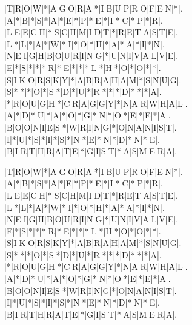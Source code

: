 \documentclass{article}
\begin{document}
\begin{figure}[htb!]
	\begin{Puzzle}{21}{13}
		|T|R|O|W|*|A|G|O|R|A|*|I|B|U|P|R|O|F|E|N|*|.
		|A|*|B|*|S|*|A|*|E|*|P|*|E|*|I|*|C|*|P|*|R|.
		|L|E|E|C|H|*|S|C|H|M|I|D|T|*|R|E|T|A|S|T|E|.
		|L|*|L|*|A|*|W|*|I|*|O|*|H|*|A|*|A|*|I|*|N|.
		|N|E|I|G|H|B|O|U|R|I|N|G|*|U|N|I|V|A|L|V|E|.
		|E|*|S|*|*|*|R|*|E|*|*|*|L|*|H|*|O|*|O|*|*|.
		|S|I|K|O|R|S|K|Y|*|A|B|R|A|H|A|M|*|S|N|U|G|.
		|S|*|*|*|O|*|S|*|D|*|U|*|R|*|*|*|D|*|*|*|A|.
		|*|R|O|U|G|H|*|C|R|A|G|G|Y|*|N|A|R|W|H|A|L|.
		|A|*|D|*|U|*|A|*|O|*|G|*|N|*|O|*|E|*|E|*|A|.
		|B|O|O|N|I|E|S|*|W|R|I|N|G|*|O|N|A|N|I|S|T|.
		|I|*|U|*|S|*|I|*|S|*|N|*|E|*|N|*|D|*|N|*|E|.
		|B|I|R|T|H|R|A|T|E|*|G|I|S|T|*|A|S|M|E|R|A|.
	\end{Puzzle}%
	\begin{PuzzleWords}{4}%
	\end{PuzzleWords}
	\begin{PuzzleWords}{5}%
	\end{PuzzleWords}
	\begin{PuzzleWords}{6}%
	\end{PuzzleWords}
	\begin{PuzzleWords}{7}%
	\end{PuzzleWords}
	\begin{PuzzleWords}{8}%
	\end{PuzzleWords}
	\begin{PuzzleWords}{9}%
	\end{PuzzleWords}
	\begin{PuzzleWords}{12}%
	\end{PuzzleWords}
\end{figure}
\newpage
\PuzzleSolution
\begin{figure}[htb!]
	\begin{Puzzle}{21}{13}
		|T|R|O|W|*|A|G|O|R|A|*|I|B|U|P|R|O|F|E|N|*|.
		|A|*|B|*|S|*|A|*|E|*|P|*|E|*|I|*|C|*|P|*|R|.
		|L|E|E|C|H|*|S|C|H|M|I|D|T|*|R|E|T|A|S|T|E|.
		|L|*|L|*|A|*|W|*|I|*|O|*|H|*|A|*|A|*|I|*|N|.
		|N|E|I|G|H|B|O|U|R|I|N|G|*|U|N|I|V|A|L|V|E|.
		|E|*|S|*|*|*|R|*|E|*|*|*|L|*|H|*|O|*|O|*|*|.
		|S|I|K|O|R|S|K|Y|*|A|B|R|A|H|A|M|*|S|N|U|G|.
		|S|*|*|*|O|*|S|*|D|*|U|*|R|*|*|*|D|*|*|*|A|.
		|*|R|O|U|G|H|*|C|R|A|G|G|Y|*|N|A|R|W|H|A|L|.
		|A|*|D|*|U|*|A|*|O|*|G|*|N|*|O|*|E|*|E|*|A|.
		|B|O|O|N|I|E|S|*|W|R|I|N|G|*|O|N|A|N|I|S|T|.
		|I|*|U|*|S|*|I|*|S|*|N|*|E|*|N|*|D|*|N|*|E|.
		|B|I|R|T|H|R|A|T|E|*|G|I|S|T|*|A|S|M|E|R|A|.
	\end{Puzzle}%
\end{figure}
\end{document}
